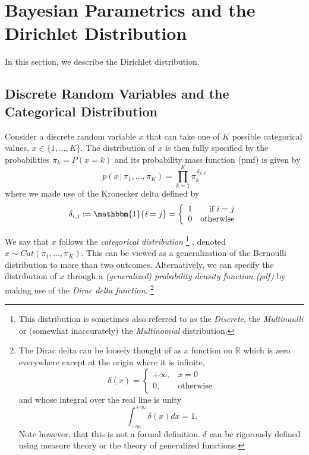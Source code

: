 \documentclass[final,3p,times,twocolumn]{elsarticle}
\begin{document}
\section{Bayesian Parametrics and the Dirichlet Distribution}
In this section, we describe the Dirichlet distribution.

\subsection{Discrete Random Variables and the Categorical Distribution}
Consider a discrete random variable $x$ that can take one of $K$ possible categorical values, $x \in \{1,\dots,K\}$.
The distribution of $x$ is then fully specified by the probabilities $\pi_k = P(x = k)$ and its probability mass function (pmf) is given by
\begin{equation}
\label{eqn:catpmf}
p(x\,|\,\pi_1,\dots,\pi_K) = \prod_{k=1}^K \pi_k^{\,\delta_{x,k}}
\end{equation}
where we made use of the Kronecker delta defined by
\begin{equation}
\label{eqn:kronecker}
\delta_{i,j} := \mathbbm{1}\{i = j\} = \left\{\begin{array}{lr}
1 & \mbox{if $i = j$}\\
0 & \mbox{otherwise} \end{array} \right.
\end{equation}

We say that $x$ follows the \emph{categorical distribution}
\footnote{This distribution is sometimes also referred to as the \emph{Discrete}, the \emph{Multinoulli} or (somewhat inaccurately) the \emph{Multinomial} distribution.}
, denoted $x \sim Cat(\pi_1, \dots, \pi_K)$.
This can be viewed as a generalization of the Bernoulli distribution to more than two outcomes.
Alternatively, we can specify the distribution of $x$ through a \emph{(generalized) probability density function (pdf)} by making use of the \emph{Dirac delta function}.
\footnote{The Dirac delta can be loosely thought of as a function on $\mathbb{R}$ which is zero everywhere except at the origin where it is infinite,
\[\delta(x) = \left\{
\begin{array}{ll}
+\infty, & x = 0\\
0, & \mbox{otherwise}
\end{array} \right.\]
and whose integral over the real line is unity
\[ \int_{-\infty}^{+\infty}\delta(x)dx = 1.\]
Note however, that this is not a formal definition. $\delta$ can be rigorously defined using measure theory or the theory of generalized functions.}
\end{document}
